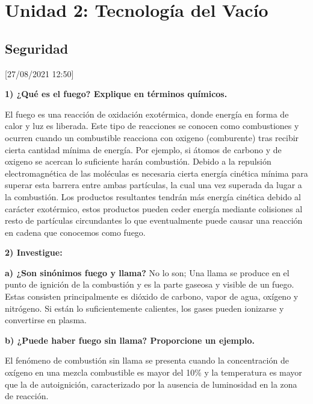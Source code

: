 \documentclass[letterpaper,11pt]{article}
\begin{document}
\section{Unidad 2: Tecnología del Vacío}

\subsection{Seguridad}

[27/08/2021  12:50]

\textbf{1) ¿Qué es el fuego? Explique en términos químicos.}

El fuego es una reacción de oxidación exotérmica, donde energía en forma de calor y luz es liberada. Este tipo de reacciones se conocen como combustiones y ocurren cuando un combustible reacciona con oxigeno (comburente) tras recibir cierta cantidad mínima de energía. Por ejemplo, si átomos de carbono y de oxigeno se acercan lo suficiente harán combustión. Debido a la repulsión electromagnética de las moléculas es necesaria cierta energía cinética mínima para superar esta barrera entre ambas partículas, la cual una vez superada da lugar a la combustión. Los productos                 resultantes tendrán más energía cinética debido al carácter exotérmico, estos productos pueden ceder energía mediante colisiones al resto de partículas circundantes lo que eventualmente puede causar una reacción en cadena que conocemos como fuego.


\textbf{2) Investigue:}

\textbf{a) ¿Son sinónimos fuego y llama?}
No lo son; Una llama se produce en el punto de ignición de la combustión y es la parte gaseosa y visible de un fuego. Estas consisten principalmente es dióxido de carbono, vapor de agua, oxígeno y nitrógeno. Si están lo suficientemente calientes, los gases pueden ionizarse y convertirse en plasma.

\textbf{b) ¿Puede haber fuego sin llama? Proporcione un ejemplo.}

El fenómeno de combustión sin llama se presenta cuando la concentración de oxígeno en una mezcla combustible es mayor del 10$\%$ y la temperatura es mayor que la de autoignición, caracterizado por la ausencia de luminosidad en la zona de reacción. 
\end{document}
